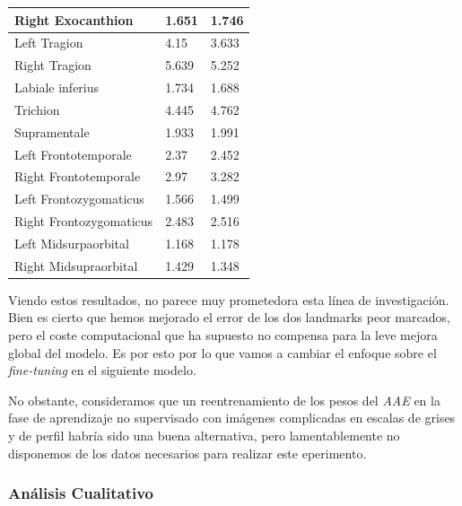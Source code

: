 \begin{table}[!ht]
\begin{tabular}{|l|l|l|}
                Right Exocanthion & \cellcolor{green!25}1.651 & 1.746 \\ \hline
                Left Tragion & 4.15 & \cellcolor{green!25}3.633 \\ \hline
                Right Tragion & 5.639 & \cellcolor{green!25}5.252 \\ \hline
                Labiale inferius & 1.734 & \cellcolor{green!25}1.688 \\ \hline
                Trichion & \cellcolor{green!25}4.445 & 4.762 \\ \hline
                Supramentale & \cellcolor{green!25}1.933 & 1.991 \\ \hline
                Left Frontotemporale & \cellcolor{green!25}2.37 & 2.452 \\ \hline
                Right Frontotemporale & \cellcolor{green!25}2.97 & 3.282 \\ \hline
                Left Frontozygomaticus & 1.566 & \cellcolor{green!25}1.499 \\ \hline
                Right Frontozygomaticus & \cellcolor{green!25}2.483 & 2.516 \\ \hline
                Left Midsurpaorbital & \cellcolor{green!25}1.168 & 1.178 \\ \hline
                Right Midsupraorbital & 1.429 & \cellcolor{green!25}1.348 \\ \hline
            \end{tabular}
            \label{table:Encode_landmarkresume}
        \end{table}

    \medskip

    \noindent Viendo estos resultados, no parece muy prometedora esta línea de investigación. Bien es cierto que hemos mejorado el error de los dos landmarks peor marcados, pero el coste computacional que ha supuesto no compensa para la leve mejora global del modelo. Es por esto por lo que vamos a cambiar el enfoque sobre el \textit{fine-tuning} en el siguiente modelo. 
    
    \medskip
    
    \noindent No obstante, consideramos que un reentrenamiento de los pesos del \textit{AAE} en la fase de aprendizaje no supervisado con imágenes complicadas en escalas de grises y de perfil habría sido una buena alternativa, pero lamentablemente no disponemos de los datos necesarios para realizar este eperimento.
    
    
    \subsubsection*{Análisis Cualitativo}
    
